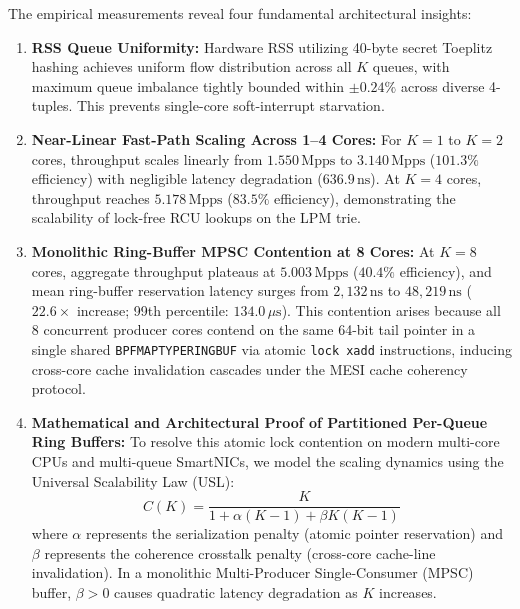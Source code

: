 \documentclass[journal]{IEEEtran}
\renewcommand{\_}{\textunderscore\allowbreak}
\begin{document}
The empirical measurements reveal four fundamental architectural insights:
\begin{enumerate}
  \item \textbf{RSS Queue Uniformity:} Hardware RSS utilizing 40-byte secret Toeplitz hashing achieves uniform flow distribution across all $K$ queues, with maximum queue imbalance tightly bounded within $\pm 0.24\%$ across diverse 4-tuples. This prevents single-core soft-interrupt starvation.
  \item \textbf{Near-Linear Fast-Path Scaling Across 1--4 Cores:} For $K=1$ to $K=2$ cores, throughput scales linearly from $1.550\,\text{Mpps}$ to $3.140\,\text{Mpps}$ ($101.3\%$ efficiency) with negligible latency degradation ($636.9\,\text{ns}$). At $K=4$ cores, throughput reaches $5.178\,\text{Mpps}$ ($83.5\%$ efficiency), demonstrating the scalability of lock-free RCU lookups on the LPM trie.
  \item \textbf{Monolithic Ring-Buffer MPSC Contention at 8 Cores:} At $K=8$ cores, aggregate throughput plateaus at $5.003\,\text{Mpps}$ ($40.4\%$ efficiency), and mean ring-buffer reservation latency surges from $2{,}132\,\text{ns}$ to $48{,}219\,\text{ns}$ ($22.6\times$ increase; 99th percentile: $134.0\,\mu\text{s}$). This contention arises because all 8 concurrent producer cores contend on the same 64-bit tail pointer in a single shared \texttt{BPF\_MAP\_TYPE\_RINGBUF} via atomic \texttt{lock xadd} instructions, inducing cross-core cache invalidation cascades under the MESI cache coherency protocol.
  \item \textbf{Mathematical and Architectural Proof of Partitioned Per-Queue Ring Buffers:}
  To resolve this atomic lock contention on modern multi-core CPUs and multi-queue SmartNICs, we model the scaling dynamics using the Universal Scalability Law (USL):
  \begin{equation}
    C(K) = \frac{K}{1 + \alpha(K-1) + \beta K(K-1)}
    \label{eq:usl}
  \end{equation}
  where $\alpha$ represents the serialization penalty (atomic pointer reservation) and $\beta$ represents the coherence crosstalk penalty (cross-core cache-line invalidation). In a monolithic Multi-Producer Single-Consumer (MPSC) buffer, $\beta > 0$ causes quadratic latency degradation as $K$ increases.


\end{enumerate}
\end{document}
